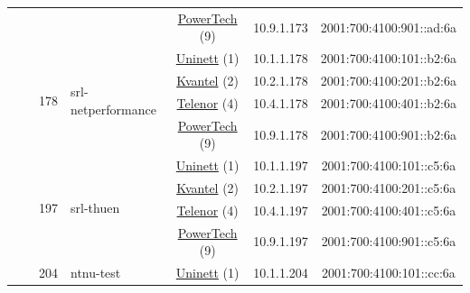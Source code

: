 \begin{small}
\begin{center}
\begin{longtable}{|c|c|c|c|c|c|c|c|}
  &  &  &  & \multicolumn{2}{|c|}{\tiny{\href{http://www.powertech.no}{PowerTech} (9)}} & \tiny{10.9.1.173} & \tiny{2001:700:4100:901::ad:6a} \\* \cline{3-3}\cline{4-4}\cline{5-5}\cline{6-6}\cline{7-7}\cline{8-8}
  &  & \multirow{4}{*}{\tiny{178}} & \multicolumn{1}{|l|}{\multirow{4}{*}{\tiny{srl-netperformance}}} & \multicolumn{2}{|c|}{\tiny{\href{https://www.uninett.no}{Uninett} (1)}} & \tiny{10.1.1.178} & \tiny{2001:700:4100:101::b2:6a} \\* \cline{5-5}\cline{6-6}\cline{7-7}\cline{8-8}
  &  &  &  & \multicolumn{2}{|c|}{\tiny{\href{http://kvantel.no}{Kvantel} (2)}} & \tiny{10.2.1.178} & \tiny{2001:700:4100:201::b2:6a} \\* \cline{5-5}\cline{6-6}\cline{7-7}\cline{8-8}
  &  &  &  & \multicolumn{2}{|c|}{\tiny{\href{https://www.telenor.no}{Telenor} (4)}} & \tiny{10.4.1.178} & \tiny{2001:700:4100:401::b2:6a} \\* \cline{5-5}\cline{6-6}\cline{7-7}\cline{8-8}
  &  &  &  & \multicolumn{2}{|c|}{\tiny{\href{http://www.powertech.no}{PowerTech} (9)}} & \tiny{10.9.1.178} & \tiny{2001:700:4100:901::b2:6a} \\* \cline{3-3}\cline{4-4}\cline{5-5}\cline{6-6}\cline{7-7}\cline{8-8}
  &  & \multirow{4}{*}{\tiny{197}} & \multicolumn{1}{|l|}{\multirow{4}{*}{\tiny{srl-thuen}}} & \multicolumn{2}{|c|}{\tiny{\href{https://www.uninett.no}{Uninett} (1)}} & \tiny{10.1.1.197} & \tiny{2001:700:4100:101::c5:6a} \\* \cline{5-5}\cline{6-6}\cline{7-7}\cline{8-8}
  &  &  &  & \multicolumn{2}{|c|}{\tiny{\href{http://kvantel.no}{Kvantel} (2)}} & \tiny{10.2.1.197} & \tiny{2001:700:4100:201::c5:6a} \\* \cline{5-5}\cline{6-6}\cline{7-7}\cline{8-8}
  &  &  &  & \multicolumn{2}{|c|}{\tiny{\href{https://www.telenor.no}{Telenor} (4)}} & \tiny{10.4.1.197} & \tiny{2001:700:4100:401::c5:6a} \\* \cline{5-5}\cline{6-6}\cline{7-7}\cline{8-8}
  &  &  &  & \multicolumn{2}{|c|}{\tiny{\href{http://www.powertech.no}{PowerTech} (9)}} & \tiny{10.9.1.197} & \tiny{2001:700:4100:901::c5:6a} \\* \cline{3-3}\cline{4-4}\cline{5-5}\cline{6-6}\cline{7-7}\cline{8-8}
  &  & \multirow{4}{*}{\tiny{204}} & \multicolumn{1}{|l|}{\multirow{4}{*}{\tiny{ntnu-test}}} & \multicolumn{2}{|c|}{\tiny{\href{https://www.uninett.no}{Uninett} (1)}} & \tiny{10.1.1.204} & \tiny{2001:700:4100:101::cc:6a} \\* \cline{5-5}\cline{6-6}\cline{7-7}\cline{8-8}

\end{longtable}
\end{center}
\end{small}
